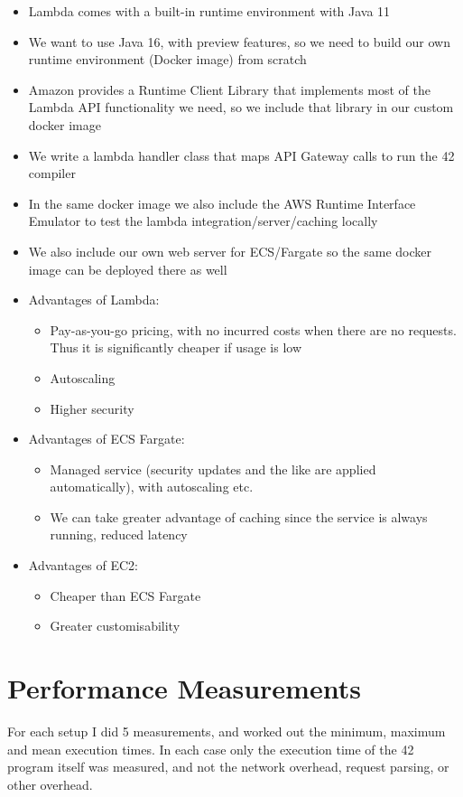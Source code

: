 \begin{itemize}
\item Lambda comes with a built-in runtime environment with Java 11
\item We want to use Java 16, with preview features, so we need to build our own runtime environment (Docker image) from scratch
\item Amazon provides a Runtime Client Library that implements most of the Lambda API functionality we need, so we include that library in our custom docker image
\item We write a lambda handler class that maps API Gateway calls to run the 42 compiler
\item In the same docker image we also include the AWS Runtime Interface Emulator to test the lambda integration/server/caching locally
\item We also include our own web server for ECS/Fargate so the same docker image can be deployed there as well
\item Advantages of Lambda:
\begin{itemize}
\item Pay-as-you-go pricing, with no incurred costs when there are no requests. Thus it is significantly cheaper if usage is low
\item Autoscaling
\item Higher security
\end{itemize}
\item Advantages of ECS Fargate:
\begin{itemize}
\item Managed service (security updates and the like are applied automatically), with autoscaling etc.
\item We can take greater advantage of caching since the service is always running, reduced latency
\end{itemize}
\item Advantages of EC2:
\begin{itemize}
\item Cheaper than ECS Fargate
\item Greater customisability
\end{itemize}
\end{itemize}

\section{Performance Measurements}

For each setup I did 5 measurements, and worked out the minimum, maximum and mean execution times. In each case only the execution time of the 42 program itself was measured, and not the network overhead, request parsing, or other overhead.

